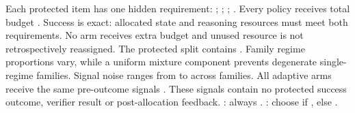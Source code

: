 \markdownRendererDocumentBegin
\markdownRendererSectionBegin
{}\markdownRendererInterblockSeparator
{}\markdownRendererSectionBegin
{}\markdownRendererInterblockSeparator
{}Each protected item has one hidden requirement:\markdownRendererInterblockSeparator
{}\markdownRendererUlBeginTight
\markdownRendererUlItem {};\markdownRendererUlItemEnd 
\markdownRendererUlItem {};\markdownRendererUlItemEnd 
\markdownRendererUlItem {};\markdownRendererUlItemEnd 
\markdownRendererUlItem {}.\markdownRendererUlItemEnd 
\markdownRendererUlEndTight \markdownRendererInterblockSeparator
{}Every policy receives total budget . Success is exact: allocated state and reasoning resources must meet both requirements. No arm receives extra budget and unused resource is not retrospectively reassigned.\markdownRendererInterblockSeparator
{}
\markdownRendererSectionEnd \markdownRendererSectionBegin
{}\markdownRendererInterblockSeparator
{}The protected split contains . Family regime proportions vary, while a uniform mixture component prevents degenerate single-regime families. Signal noise  ranges from  to  across families.\markdownRendererInterblockSeparator
{}All adaptive arms receive the same pre-outcome signals\markdownRendererInterblockSeparator
{}\markdownRendererHardLineBreak
{}.\markdownRendererInterblockSeparator
{}These signals contain no protected success outcome, verifier result or post-allocation feedback.\markdownRendererInterblockSeparator
{}
\markdownRendererSectionEnd \markdownRendererSectionBegin
{}\markdownRendererInterblockSeparator
{}\markdownRendererUlBeginTight
\markdownRendererUlItem {}: always .\markdownRendererUlItemEnd 
\markdownRendererUlItem {}: choose  if , else .\markdownRendererUlItemEnd 
